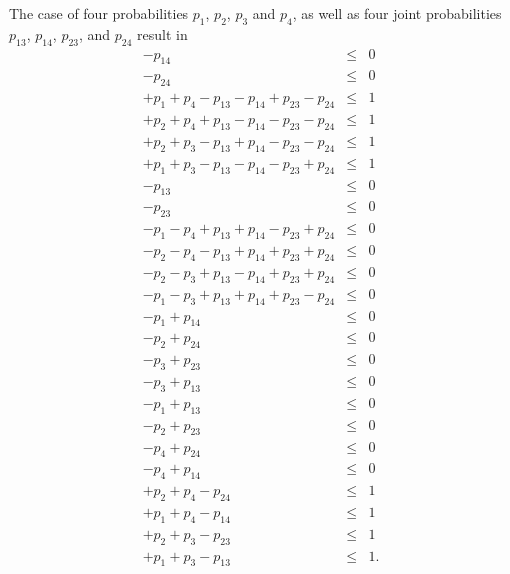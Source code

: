 \documentclass[%
 showpacs,
 showkeys,
 preprintnumbers,
 amsmath,amssymb,
 aps,
  pra,
  longbibliography,
 floatfix,
 ]{revtex4-1}
\begin{document}
The case of four probabilities
$p_1$, $p_2$, $p_3$  and $p_4$,
as well as four joint probabilities $p_{13}$, $p_{14}$, $p_{23}$, and $p_{24}$
result in
\begin{eqnarray}
                                          -p_{14}                        &\le&  0\\
                                                            -p_{24}      &\le&  0\\
 +p_{1}                  +p_{4}  -p_{13}  -p_{14}  +p_{23}  -p_{24}      &\le&  1\\
         +p_{2}          +p_{4}  +p_{13}  -p_{14}  -p_{23}  -p_{24}      &\le&  1\\
         +p_{2}  +p_{3}          -p_{13}  +p_{14}  -p_{23}  -p_{24}      &\le&  1\\
 +p_{1}          +p_{3}          -p_{13}  -p_{14}  -p_{23}  +p_{24}      &\le&  1\\
                                 -p_{13}                                 &\le&  0\\
                                                   -p_{23}               &\le&  0\\
 -p_{1}                  -p_{4}  +p_{13}  +p_{14}  -p_{23}  +p_{24}      &\le&  0\\
         -p_{2}          -p_{4}  -p_{13}  +p_{14}  +p_{23}  +p_{24}      &\le&  0\\
         -p_{2}  -p_{3}          +p_{13}  -p_{14}  +p_{23}  +p_{24}      &\le&  0\\
 -p_{1}          -p_{3}          +p_{13}  +p_{14}  +p_{23}  -p_{24}      &\le&  0\\
 -p_{1}                                   +p_{14}                        &\le&  0\\
         -p_{2}                                             +p_{24}      &\le&  0\\
                 -p_{3}                            +p_{23}               &\le&  0\\
                 -p_{3}          +p_{13}                                 &\le&  0\\
 -p_{1}                          +p_{13}                                 &\le&  0\\
         -p_{2}                                    +p_{23}               &\le&  0\\
                         -p_{4}                             +p_{24}      &\le&  0\\
                         -p_{4}           +p_{14}                        &\le&  0\\
         +p_{2}          +p_{4}                             -p_{24}      &\le&  1\\
 +p_{1}                  +p_{4}           -p_{14}                        &\le&  1\\
         +p_{2}  +p_{3}                            -p_{23}               &\le&  1\\
 +p_{1}          +p_{3}          -p_{13}                                 &\le&  1
.
\label{2017-b-2-2-p-c}
\end{eqnarray}
\end{document}
